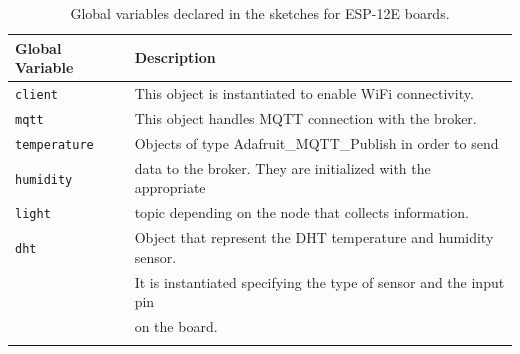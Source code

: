 \noindent\begin{minipage}{\textwidth}
	\begingroup
	\setlength{\LTleft}{-20cm plus -1fill}
	\setlength{\LTright}{\LTleft}
	\begin{longtable}{l | l}
		\hline
		\textbf{Global Variable} & \textbf{Description} \\
		\hline
		\hline
		\texttt{client} & This object is instantiated to enable WiFi connectivity. \\
		\hline
		\texttt{mqtt} & This object handles MQTT connection with the broker. \\
		\hline
		\texttt{temperature} & Objects of type Adafruit\_MQTT\_Publish in order to send \\ 
		\texttt{humidity}    & data to the broker. They are initialized with the appropriate \\
		\texttt{light}       & topic depending on the node that collects information.   \\
		\hline
		\texttt{dht} & Object that represent the DHT temperature and humidity sensor. \\
		             & It is instantiated specifying the type of sensor and the input pin \\
		             & on the board. \\
		\hline
		
		\caption{Global variables declared in the sketches for ESP-12E boards.}
		\label{esp12_global_variables}
	\end{longtable}
	\endgroup
\end{minipage}

